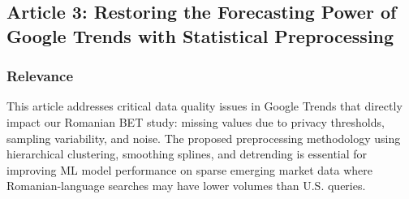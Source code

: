 \documentclass[12pt,a4paper]{article}
\begin{document}
\subsection{Article 3: Restoring the Forecasting Power of Google Trends with Statistical Preprocessing}

\subsubsection{Relevance}
This article addresses critical data quality issues in Google Trends that directly impact our Romanian BET study: missing values due to privacy thresholds, sampling variability, and noise. The proposed preprocessing methodology using hierarchical clustering, smoothing splines, and detrending is essential for improving ML model performance on sparse emerging market data where Romanian-language searches may have lower volumes than U.S. queries.
\end{document}
